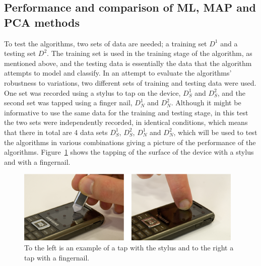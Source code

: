 \subsection{Performance and comparison of ML, MAP and PCA methods}
To test the algorithms, two sets of data are needed; a training set $D^1$ and a testing set $D^2$. The training set is used in the training stage of the algorithm, as mentioned above, and the testing data is essentially the data that the algorithm attempts to model and classify. In an attempt to evaluate the algorithms' robustness to variations, two different sets of training and testing data were used. One set was recorded using a stylus to tap on the device, $D^1_S$ and $D^2_S$, and the second set was tapped using a finger nail, $D^1_N$ and $D^2_N$. Although it might be informative to use the same data for the training and testing stage, in this test the two sets were independently recorded, in identical conditions, which means that there in total are 4 data sets $D^1_S$, $D^2_S$, $D^1_N$ and $D^2_N$, which will be used to test the algorithms in various combinations giving a picture of the performance of the algorithms. Figure~\ref{fig:tapSN} shows the tapping of the surface of the device with a stylus and with a fingernail.

\DIFaddbegin \label{corrections:DSNmethod}

\DIFaddend \begin{figure}[!]
\centering
\includegraphics[width=410 px]{tapSN.png}
\caption{To the left is an example of a tap with the stylus and to the right a tap with a fingernail.}\label{fig:tapSN}
\end{figure}

